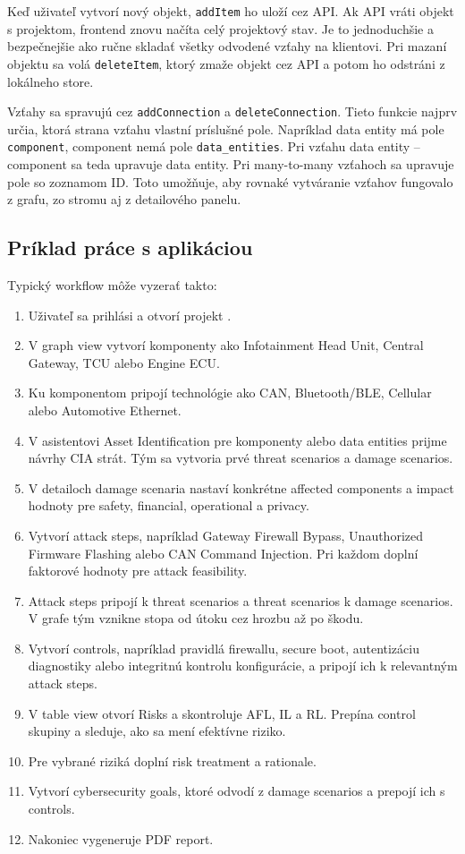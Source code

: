 \documentclass[11pt]{article}
\begin{document}
Keď uživateľ vytvorí nový objekt, \texttt{addItem} ho uloží cez API. Ak API vráti objekt s projektom, frontend znovu načíta celý projektový stav. Je to jednoduchšie a bezpečnejšie ako ručne skladať všetky odvodené vzťahy na klientovi. Pri mazaní objektu sa volá \texttt{deleteItem}, ktorý zmaže objekt cez API a potom ho odstráni z lokálneho store.

Vzťahy sa spravujú cez \texttt{addConnection} a \texttt{deleteConnection}. Tieto funkcie najprv určia, ktorá strana vzťahu vlastní príslušné pole. Napríklad data entity má pole \texttt{component}, component nemá pole \texttt{data\_entities}. Pri vzťahu data entity -- component sa teda upravuje data entity. Pri many-to-many vzťahoch sa upravuje pole so zoznamom ID. Toto umožňuje, aby rovnaké vytváranie vzťahov fungovalo z grafu, zo stromu aj z detailového panelu.

\subsection{Príklad práce s aplikáciou}

Typický workflow môže vyzerať takto:

\begin{enumerate}
    \item Uživateľ sa prihlási a otvorí projekt .
    \item V graph view vytvorí komponenty ako Infotainment Head Unit, Central Gateway, TCU alebo Engine ECU.
    \item Ku komponentom pripojí technológie ako CAN, Bluetooth/BLE, Cellular alebo Automotive Ethernet.
    \item V asistentovi Asset Identification pre komponenty alebo data entities prijme návrhy CIA strát. Tým sa vytvoria prvé threat scenarios a damage scenarios.
    \item V detailoch damage scenaria nastaví konkrétne affected components a impact hodnoty pre safety, financial, operational a privacy.
    \item Vytvorí attack steps, napríklad Gateway Firewall Bypass, Unauthorized Firmware Flashing alebo CAN Command Injection. Pri každom doplní faktorové hodnoty pre attack feasibility.
    \item Attack steps pripojí k threat scenarios a threat scenarios k damage scenarios. V grafe tým vznikne stopa od útoku cez hrozbu až po škodu.
    \item Vytvorí controls, napríklad pravidlá firewallu, secure boot, autentizáciu diagnostiky alebo integritnú kontrolu konfigurácie, a pripojí ich k relevantným attack steps.
    \item V table view otvorí Risks a skontroluje AFL, IL a RL. Prepína control skupiny a sleduje, ako sa mení efektívne riziko.
    \item Pre vybrané riziká doplní risk treatment a rationale.
    \item Vytvorí cybersecurity goals, ktoré odvodí z damage scenarios a prepojí ich s controls.
    \item Nakoniec vygeneruje PDF report.
\end{enumerate}
\end{document}
